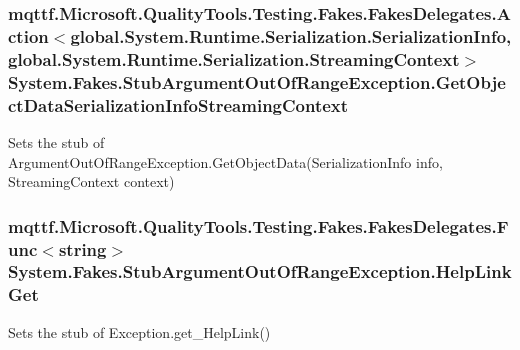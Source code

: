 \hypertarget{class_system_1_1_fakes_1_1_stub_argument_out_of_range_exception_a6e27da5537e2f58e2ad4719c8a636612}{
\subsubsection[{Get\-Object\-Data\-Serialization\-Info\-Streaming\-Context}]{\setlength{\rightskip}{0pt plus 5cm}mqttf.\-Microsoft.\-Quality\-Tools.\-Testing.\-Fakes.\-Fakes\-Delegates.\-Action$<$global.\-System.\-Runtime.\-Serialization.\-Serialization\-Info, global.\-System.\-Runtime.\-Serialization.\-Streaming\-Context$>$ System.\-Fakes.\-Stub\-Argument\-Out\-Of\-Range\-Exception.\-Get\-Object\-Data\-Serialization\-Info\-Streaming\-Context}}\label{class_system_1_1_fakes_1_1_stub_argument_out_of_range_exception_a6e27da5537e2f58e2ad4719c8a636612}


Sets the stub of Argument\-Out\-Of\-Range\-Exception.\-Get\-Object\-Data(\-Serialization\-Info info, Streaming\-Context context)

\hypertarget{class_system_1_1_fakes_1_1_stub_argument_out_of_range_exception_aa6a9bf471d00e42637cc56a162eef3d8}{
\subsubsection[{Help\-Link\-Get}]{\setlength{\rightskip}{0pt plus 5cm}mqttf.\-Microsoft.\-Quality\-Tools.\-Testing.\-Fakes.\-Fakes\-Delegates.\-Func$<$string$>$ System.\-Fakes.\-Stub\-Argument\-Out\-Of\-Range\-Exception.\-Help\-Link\-Get}}\label{class_system_1_1_fakes_1_1_stub_argument_out_of_range_exception_aa6a9bf471d00e42637cc56a162eef3d8}


Sets the stub of Exception.\-get\-\_\-\-Help\-Link()

